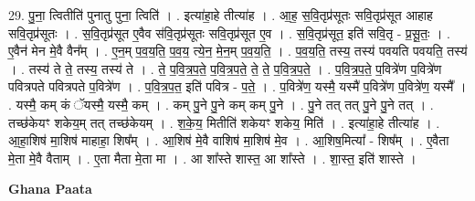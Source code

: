 \documentclass[17pt]{extarticle}
\begin{document}
29. पु॒ना॒ त्वितीति॑ पुनातु पुना॒ त्विति॑ । . इत्या॑हा॒हे तीत्या॑ह । . आ॒ह॒ स॒वि॒तृप्र॑सूतः सवि॒तृप्र॑सूत आहाह सवि॒तृप्र॑सूतः । . स॒वि॒तृप्र॑सूत ए॒वैव स॑वि॒तृप्र॑सूतः सवि॒तृप्र॑सूत ए॒व । . स॒वि॒तृप्र॑सूत॒ इति॑ सवि॒तृ - प्र॒सू॒तः॒ । . ए॒वैन॑ मेन मे॒वै वैन᳚म् । . ए॒न॒म् प॒व॒य॒ति॒ प॒व॒य॒ त्ये॒न॒ मे॒न॒म् प॒व॒य॒ति॒ । . प॒व॒य॒ति॒ तस्य॒ तस्य॑ पवयति पवयति॒ तस्य॑ । . तस्य॑ ते ते॒ तस्य॒ तस्य॑ ते । . ते॒ प॒वि॒त्र॒प॒ते॒ प॒वि॒त्र॒प॒ते॒ ते॒ ते॒ प॒वि॒त्र॒प॒ते॒ । . प॒वि॒त्र॒प॒ते॒ प॒वित्रे॑ण प॒वित्रे॑ण पवित्रपते पवित्रपते प॒वित्रे॑ण । . प॒वि॒त्र॒प॒त॒ इति॑ पवित्र - प॒ते॒ । . प॒वित्रे॑ण॒ यस्मै॒ यस्मै॑ प॒वित्रे॑ण प॒वित्रे॑ण॒ यस्मै᳚ । . यस्मै॒ कम् कं ॅयस्मै॒ यस्मै॒ कम् । . कम् पु॒ने पु॒ने कम् कम् पु॒ने । . पु॒ने तत् तत् पु॒ने पु॒ने तत् । . तच्छ॑केयꣳ शकेय॒म् तत् तच्छ॑केयम् । . श॒के॒य॒ मितीति॑ शकेयꣳ शकेय॒ मिति॑ । . इत्या॑हा॒हे तीत्या॑ह । . आ॒हा॒शिष॑ मा॒शिष॑ माहाहा॒ शिष᳚म् । . आ॒शिष॑ मे॒वै वाशिष॑ मा॒शिष॑ मे॒व । . आ॒शिष॒मित्या᳚ - शिष᳚म् । . ए॒वैता मे॒ता मे॒वै वैताम् । . ए॒ता मैता मे॒ता मा । . आ शा᳚स्ते शास्त॒ आ शा᳚स्ते । . शा॒स्त॒ इति॑ शास्ते । \newline

\textbf{Ghana Paata } \newline
\end{document}
